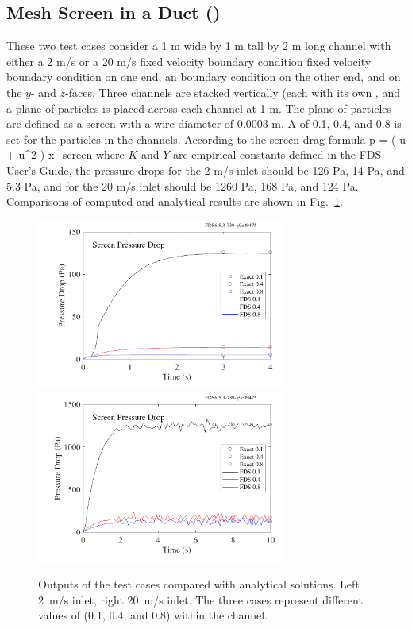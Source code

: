 \documentclass[11pt]{book}
\begin{document}
\subsection{Mesh Screen in a Duct (\texorpdfstring{}{screen\_drag})}
\label{screen_drag_1}
\label{screen_drag_2}

These two test cases consider a 1 m wide by 1 m tall by 2 m long channel with either a 2 m/s or a 20 m/s fixed velocity boundary condition fixed velocity boundary condition on one end, an  boundary condition on the other end, and  on the $y$- and $z$-faces.  Three channels are stacked vertically (each with its own , and a plane of particles is placed across each channel at 1 m.  The plane of particles are defined as a screen with a wire diameter of 0.0003 m.  A  of 0.1, 0.4, and 0.8 is set for the particles in the channels.  According to the screen drag formula
\be
   \Delta p \;= \; \left(  u \; + \; \rho {} u^2 \right) \Delta x_{\rm screen}
\ee
where $K$ and $Y$ are empirical constants defined in the FDS User's Guide, the pressure drops for the 2 m/s inlet should be 126 Pa, 14 Pa, and 5.3 Pa, and for the 20 m/s inlet should be 1260 Pa, 168 Pa, and 124 Pa.   Comparisons of computed and analytical results are shown in Fig.~\ref{screen_drag_plots}.

\begin{figure}[ht]
\includegraphics[width=3.2in]{SCRIPT_FIGURES/screen_drag_1}
\includegraphics[width=3.2in]{SCRIPT_FIGURES/screen_drag_2}
\caption[Sample cases ]{Outputs of the  test cases compared with analytical solutions.  Left 2~m/s inlet, right 20~m/s inlet.  The three cases represent different values of  (0.1, 0.4, and 0.8) within the channel.}
\label{screen_drag_plots}
\end{figure}
\end{document}

